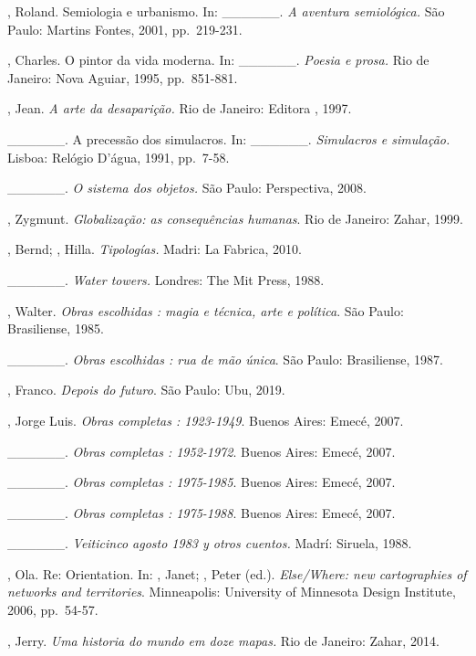 \begin{Parskip}
, Roland. Semiologia e urbanismo. In: \_\_\_\_\_\_. \emph{A
aventura semiológica.} São Paulo: Martins Fontes, 2001, pp.~219-231.

, Charles. O pintor da vida moderna. In: \_\_\_\_\_\_.
\emph{Poesia e prosa.} Rio de Janeiro: Nova Aguiar, 1995, pp.~851-881.

, Jean. \emph{A arte da desaparição.} Rio de Janeiro:
Editora , 1997.

\_\_\_\_\_\_. A precessão dos simulacros. In: \_\_\_\_\_\_.
\emph{Simulacros e simulação.} Lisboa: Relógio D'água, 1991, pp.~7-58.

\_\_\_\_\_\_. \emph{O sistema dos objetos.} São Paulo:
Perspectiva, 2008.

, Zygmunt. \emph{Globalização: as consequências humanas}. Rio de
Janeiro: Zahar, 1999.

, Bernd; , Hilla. \emph{Tipologías.} Madri: La Fabrica,
2010.

\_\_\_\_\_\_. \emph{Water towers.} Londres: The Mit Press, 1988. %

, Walter. \emph{Obras escolhidas : magia e técnica, arte e
política}. São Paulo: Brasiliense, 1985.

\_\_\_\_\_\_. \emph{Obras escolhidas : rua de mão única}. São
Paulo: Brasiliense, 1987.

, Franco. \emph{Depois do futuro}. São Paulo: Ubu, 2019.

, Jorge Luis. \emph{Obras completas : 1923-1949}. Buenos Aires:
Emecé, 2007.

\_\_\_\_\_\_. \emph{Obras completas : 1952-1972}. Buenos Aires:
Emecé, 2007.

\_\_\_\_\_\_. \emph{Obras completas : 1975-1985}. Buenos Aires:
Emecé, 2007.

\_\_\_\_\_\_. \emph{Obras completas : 1975-1988}. Buenos Aires:
Emecé, 2007.

\_\_\_\_\_\_. \emph{Veiticinco agosto 1983 y otros cuentos.}
Madrí: Siruela, 1988.

, Ola. Re: Orientation. In: , Janet; , Peter (ed.).
\emph{Else/Where: new cartographies of networks and territories}.
Minneapolis: University of Minnesota Design Institute, 2006, pp.~54-57.

, Jerry. \emph{Uma historia do mundo em doze mapas.} Rio de
Janeiro: Zahar, 2014.


\end{Parskip}
